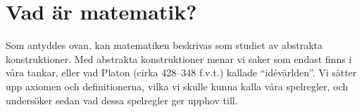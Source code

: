 \section{Vad är matematik?}
Som antyddes ovan, kan matematiken beskrivas som studiet av abstrakta 
konstruktioner.
Med abstrakta konstruktioner menar vi saker som endast finns i våra tankar, 
eller vad Platon (cirka 428--348 f.v.t.) kallade \enquote{idévärlden}.
Vi sätter upp axiomen och definitionerna, vilka vi skulle kunna kalla våra 
spelregler, och undersöker sedan vad dessa spelregler ger upphov till.

